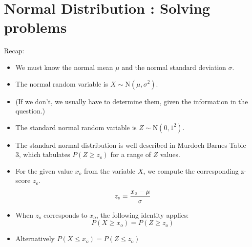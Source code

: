 \documentclass[]{report}
\begin{document}
\section{Normal Distribution : Solving problems}
Recap:
\begin{itemize}
\item We must know the normal mean $\mu$ and the normal standard deviation $\sigma$.
\item The normal random variable is $X \sim \mbox{N} ( \mu , \sigma^2)$.\smallskip
\item (If we don't, we usually have to determine them, given the information in the question.)\smallskip
\item The standard normal random variable is $Z\sim \mbox{N} ( 0 , 1^2)$.\smallskip
\item The standard normal distribution is well described in Murdoch Barnes Table 3, which tabulates $P(Z \geq z_o)$ for a range of $Z$ values.
\end{itemize}



\begin{itemize}
\item For the given value $x_o$ from the variable $X$, we compute the corresponding z-score $z_o$.
\[ z_o = { x_o - \mu \over \sigma} \]
\item When $z_o$ corresponds to $x_o$, the following identity applies:
\[  P(X \geq x_o )= P(Z \geq z_o ) \]
\item Alternatively $ P(X \leq x_o )= P(Z \leq z_o ) $
\end{itemize}
\end{document}
